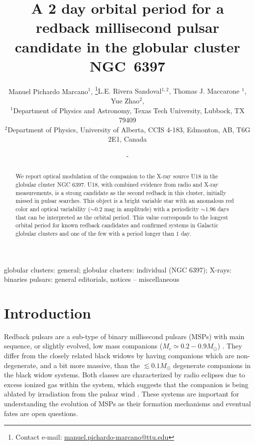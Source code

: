 \documentclass[fleqn,usenatbib,useAMS,letters]{mnras}
\title[A 2 day orbital period for a redback MSP Candidate in the Globular Cluster NGC~6397]{A 2 day orbital period for a redback millisecond pulsar candidate in the globular cluster NGC~6397}
\author[Manuel Pichardo Marcano, other]{Manuel Pichardo Marcano$^{1}$, \thanks{Contact e-mail: \href{manuel.pichardo-marcano@ttu.edu}{manuel.pichardo-marcano@ttu.edu}}{L.E. Rivera Sandoval$^{1,2}$, Thomas J.  Maccarone $^{1}$, Yue Zhao$^{2}$, }
\newauthor{Craig O. Heinke$^{2}$}%
\\
$^{1}$Department of Physics and Astronomy, Texas Tech University, Lubbock, TX 79409\\
$^{2}$Department of Physics, University of Alberta, CCIS 4-183, Edmonton, AB, T6G 2E1, Canada}
\date{-}
\begin{document}
\label{firstpage}
\pagerange{\pageref{firstpage}--\pageref{lastpage}}
\maketitle

\begin{abstract}
We report optical modulation of the companion to the %
X-ray source 
U18 in the globular cluster NGC 6397. U18, with combined evidence from radio and X-ray measurements, is a strong candidate as the second redback in this cluster, initially missed in pulsar searches. This object is a bright variable star with an anomalous red color and optical variability ($\sim0.2$ mag in amplitude) with a periodicity $\sim 1.96$ days that can be interpreted as the orbital period. This value corresponds to the longest orbital period for known redback candidates and confirmed systems in Galactic globular clusters and one of the few with a period longer than 1 day. 
\end{abstract}

\begin{keywords}
globular clusters: general; globular clusters: individual (NGC 6397); X-rays: binaries pulsars: general
editorials, notices -- miscellaneous
\end{keywords}




\section{Introduction}

Redback pulsars are a sub-type of binary millisecond pulsars (MSPs) with main sequence, or slightly evolved, low mass companions ($M_{c} \simeq 0.2 - 0.9 M_\odot$) \citep{MalloryRedback2013}. They differ from the closely related black widows by having companions which are non-degenerate, and a bit more massive, than the $\lesssim0.1 M_\odot$  degenerate companions in the black widow systems. Both classes are characterized by radio eclipses due to excess ionized gas within the system, which suggests that the companion is being ablated by irradiation from the pulsar wind \citep{FruchterEclipse1988,Fruchter88b}. These systems are important for understanding the evolution of MSPs as their formation mechanisms and eventual fates are open questions.
\end{document}
